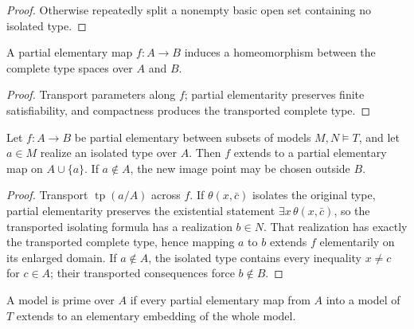 \begin{proof}
\leanok
{}
Otherwise repeatedly split a nonempty basic open set containing no
isolated type.
\end{proof}

\begin{lemma}
\label{lem:type-space-homeomorphism}
\leanok
{}
A partial elementary map \(f:A\to B\) induces a homeomorphism between
the complete type spaces over \(A\) and \(B\).
\end{lemma}

\begin{proof}
\leanok
{}
Transport parameters along \(f\); partial elementarity preserves finite
satisfiability, and compactness produces the transported complete type.
\end{proof}

\begin{lemma}
\label{lem:extend-partial-elementary-by-isolated-type}
Let \(f:A\to B\) be partial elementary between subsets of models
\(M,N\models T\), and let \(a\in M\) realize an isolated type over
\(A\).  Then \(f\) extends to a partial elementary map on
\(A\cup\{a\}\).  If \(a\notin A\), the new image point may be chosen
outside \(B\).
\end{lemma}

\begin{proof}
Transport \(\operatorname{tp}(a/A)\) across \(f\).  If
\(\theta(x,\bar c)\) isolates the original type, partial elementarity
preserves the existential statement \(\exists x\,\theta(x,\bar c)\),
so the transported isolating formula has a realization \(b\in N\).
That realization has exactly the transported complete type, hence
mapping \(a\) to \(b\) extends \(f\) elementarily on its enlarged
domain.  If \(a\notin A\), the isolated type contains every inequality
\(x\neq c\) for \(c\in A\); their transported consequences force
\(b\notin B\).
\end{proof}

\begin{definition}
\label{def:prime-over}
A model is prime over \(A\) if every partial elementary map from \(A\)
into a model of \(T\) extends to an elementary embedding of the whole
model.
\end{definition}

